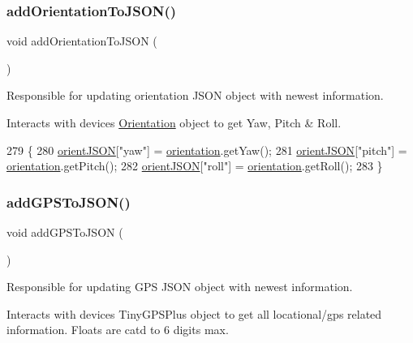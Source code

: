 \subsubsection{\texorpdfstring{add\+Orientation\+To\+J\+S\+O\+N()}{addOrientationToJSON()}}
{\footnotesize\ttfamily void add\+Orientation\+To\+J\+S\+ON (\begin{DoxyParamCaption}{ }\end{DoxyParamCaption})}



Responsible for updating orientation J\+S\+ON object with newest information. 

Interacts with devices \hyperlink{class_orientation}{Orientation} object to get Yaw, Pitch \& Roll. 
\begin{DoxyCode}
279 \{
280   \hyperlink{logging-device_8ino_ae8e95a76df2aaa373792e5b744a6bb73}{orientJSON}[\textcolor{stringliteral}{"yaw"}] = \hyperlink{logging-device_8ino_a47be0262307aa023a1bda3d98986a16d}{orientation}.getYaw();
281   \hyperlink{logging-device_8ino_ae8e95a76df2aaa373792e5b744a6bb73}{orientJSON}[\textcolor{stringliteral}{"pitch"}] = \hyperlink{logging-device_8ino_a47be0262307aa023a1bda3d98986a16d}{orientation}.getPitch();
282   \hyperlink{logging-device_8ino_ae8e95a76df2aaa373792e5b744a6bb73}{orientJSON}[\textcolor{stringliteral}{"roll"}] = \hyperlink{logging-device_8ino_a47be0262307aa023a1bda3d98986a16d}{orientation}.getRoll();
283 \}
\end{DoxyCode}
\mbox{\label{logging-device_8ino_af1705fad6a6282b24379a174e18d4fe4}} 
\subsubsection{\texorpdfstring{add\+G\+P\+S\+To\+J\+S\+O\+N()}{addGPSToJSON()}}
{\footnotesize\ttfamily void add\+G\+P\+S\+To\+J\+S\+ON (\begin{DoxyParamCaption}{ }\end{DoxyParamCaption})}



Responsible for updating G\+PS J\+S\+ON object with newest information. 

Interacts with devices Tiny\+G\+P\+S\+Plus object to get all locational/gps related information. Floats are cat\textquotesingle{}d to 6 digits max. 


